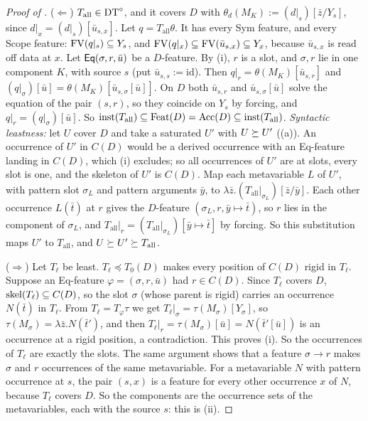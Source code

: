 \begin{proof}[Proof of ]
($\Leftarrow$) $T_{\mathrm{all}}\in\mathrm{DT}^{\circ}$, and it covers $D$ with $\theta_d(M_K):=(d|_s)[\bar z/Y_s]$, since $d|_x=(d|_s)[\bar u_{s,x}]$. Let $q=T_{\mathrm{all}}\theta$. It has every Sym feature, and every Scope feature: $\mathrm{FV}(q|_s)\subseteq Y_s$, and $\mathrm{FV}(q|_x)\subseteq\mathrm{FV}(\bar u_{s,x})\subseteq Y_x$, because $\bar u_{s,x}$ is read off data at $x$. Let $\mathsf{Eq}(\sigma,r,\bar u)$ be a $D$-feature. By (i), $r$ is a slot, and $\sigma,r$ lie in one component $K$, with source $s$ (put $\bar u_{s,s}:=\mathrm{id}$). Then $q|_r=\theta(M_K)[\bar u_{s,r}]$ and $(q|_\sigma)[\bar u]=\theta(M_K)[\bar u_{s,\sigma}[\bar u]]$. On $D$ both $\bar u_{s,r}$ and $\bar u_{s,\sigma}[\bar u]$ solve the equation of the pair $(s,r)$, so they coincide on $Y_s$ by forcing, and $q|_r=(q|_\sigma)[\bar u]$. So $\mathrm{inst}(T_{\mathrm{all}})\subseteq\mathrm{Feat}(D)=\mathrm{Acc}(D)\subseteq\mathrm{inst}(T_{\mathrm{all}})$. \emph{Syntactic leastness:} let $U$ cover $D$ and take a saturated $U'$ with $U\succeq U'$ ((a)). An occurrence of $U'$ in $C(D)$ would be a derived occurrence with an Eq-feature landing in $C(D)$, which (i) excludes; so all occurrences of $U'$ are at slots, every slot is one, and the skeleton of $U'$ is $C(D)$. Map each metavariable $L$ of $U'$, with pattern slot $\sigma_L$ and pattern arguments $\bar y$, to $\lambda\bar z.(T_{\mathrm{all}}|_{\sigma_L})[\bar z/\bar y]$. Each other occurrence $L(\bar t)$ at $r$ gives the $D$-feature $(\sigma_L,r,\bar y\mapsto\bar t)$, so $r$ lies in the component of $\sigma_L$, and $T_{\mathrm{all}}|_r=(T_{\mathrm{all}}|_{\sigma_L})[\bar y\mapsto\bar t]$ by forcing. So this substitution maps $U'$ to $T_{\mathrm{all}}$, and $U\succeq U'\succeq T_{\mathrm{all}}$.

($\Rightarrow$) Let $T_\ell$ be least. $T_\ell\preceq T_0(D)$ makes every position of $C(D)$ rigid in $T_\ell$. Suppose an Eq-feature $\varphi=(\sigma,r,\bar u)$ had $r\in C(D)$. Since $T_\ell$ covers $D$, $\mathrm{skel}(T_\ell)\subseteq C(D)$, so the slot $\sigma$ (whose parent is rigid) carries an occurrence $N(\bar t)$ in $T_\ell$. From $T_\ell=T_\varphi\tau$ we get $T_\ell|_\sigma=\tau(M_\sigma)[Y_\sigma]$, so $\tau(M_\sigma)=\lambda\bar z.N(\bar t')$, and then $T_\ell|_r=\tau(M_\sigma)[\bar u]=N(\bar t'[\bar u])$ is an occurrence at a rigid position, a contradiction. This proves (i). So the occurrences of $T_\ell$ are exactly the slots. The same argument shows that a feature $\sigma\to r$ makes $\sigma$ and $r$ occurrences of the same metavariable. For a metavariable $N$ with pattern occurrence at $s$, the pair $(s,x)$ is a feature for every other occurrence $x$ of $N$, because $T_\ell$ covers $D$. So the components are the occurrence sets of the metavariables, each with the source $s$: this is (ii).
\end{proof}

